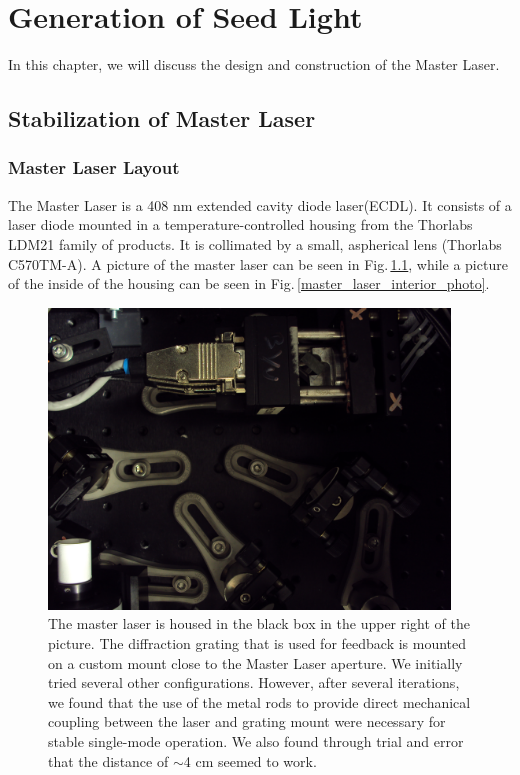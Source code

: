 \chapter{Generation of Seed Light}\label{generationOfSeedLight}

In this chapter, we will discuss the design and construction of the Master Laser. 

\section{Stabilization of Master Laser}
\subsection{Master Laser Layout}
The Master Laser is a 408 nm extended cavity diode laser(ECDL). It consists of a laser diode mounted in a temperature-controlled housing from the Thorlabs LDM21 family of products. It is collimated by a small, aspherical lens (Thorlabs C570TM-A). A picture of the master laser can be seen in Fig.\,\ref{master_laser_photo}, while a picture of the inside of the housing can be seen in Fig.\,\ref{master_laser_interior_photo}.

\begin{figure}
\centerline{
\includegraphics[width=0.95\textwidth]{master_laser.JPG}}
\caption[Photograph of Master Laser]{\label{master_laser_photo} The master laser is housed in the black box in the upper right of the picture. The diffraction grating that is used for feedback is mounted on a custom mount close to the Master Laser aperture. We initially tried several other configurations. However, after several iterations, we found that the use of the metal rods to provide direct  mechanical coupling between the laser and grating mount were necessary for stable single-mode operation. We also found through trial and error that the distance of $\sim$4 cm seemed to work. }
\end{figure}

